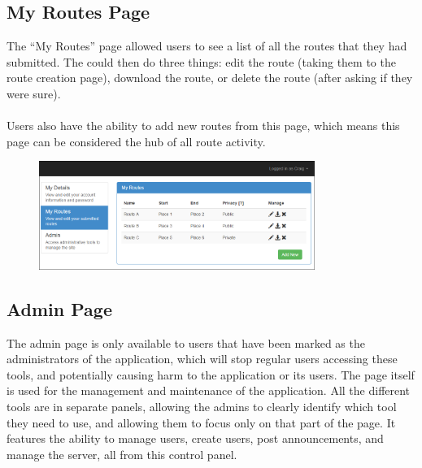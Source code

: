 \documentclass[a4paper,twoside,notitlepage,11pt]{article}
\begin{document}
\subsection{My Routes Page}
The ``My Routes'' page allowed users to see a list of all the routes that they had submitted. The could then do three things: edit the route (taking them to the route creation page), download the route, or delete the route (after asking if they were sure).\ \\
\ \\
Users also have the ability to add new routes from this page, which means this page can be considered the hub of all route activity. 

\begin{figure}[!ht]
	\begin{center}
		\includegraphics[width=0.8\textwidth]{images/final/myroutes.png}
	\end{center}
	\vspace{-6mm}
\end{figure} 
\newpage 

\subsection{Admin Page}
The admin page is only available to users that have been marked as the administrators of the application, which will stop regular users accessing these tools, and potentially causing harm to the application or its users. The page itself is used for the management and maintenance of the application. All the different tools are in separate panels, allowing the admins to clearly identify which tool they need to use, and allowing them to focus only on that part of the page. It features the ability to manage users, create users, post announcements, and manage the server, all from this control panel.
\end{document}

